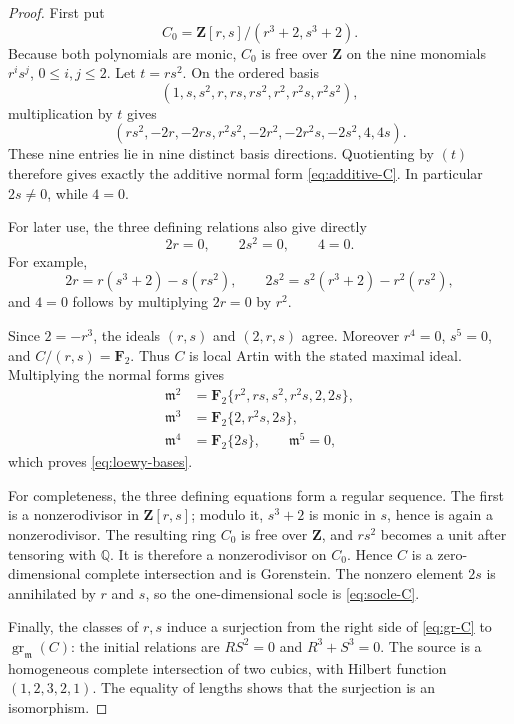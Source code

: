 \documentclass[11pt]{amsart}
\theoremstyle{definition}
\theoremstyle{remark}
\newcommand{\Z}{\mathbf Z}
\newcommand{\F}{\mathbf F}
\newcommand{\gr}{\operatorname{gr}}
\newcommand{\m}{\mathfrak m}
\begin{document}
\begin{proof}
First put
\[
 C_0=\Z[r,s]/(r^3+2,s^3+2).
\]
Because both polynomials are monic, \(C_0\) is free over \(\Z\) on the
nine monomials \(r^is^j\), \(0\le i,j\le2\).  Let \(t=rs^2\).  On the
ordered basis
\[
 (1,s,s^2,r,rs,rs^2,r^2,r^2s,r^2s^2),
\]
multiplication by \(t\) gives
\[
 (rs^2,-2r,-2rs,r^2s^2,-2r^2,-2r^2s,-2s^2,4,4s).
\]
These nine entries lie in nine distinct basis directions.  Quotienting by
\((t)\) therefore gives exactly the additive normal form
\eqref{eq:additive-C}.  In particular \(2s\ne0\), while \(4=0\).

For later use, the three defining relations also give directly
\begin{equation}\label{eq:base-consequences}
 2r=0,
 \qquad
 2s^2=0,
 \qquad
 4=0.
\end{equation}
For example,
\[
 2r=r(s^3+2)-s(rs^2),
 \qquad
 2s^2=s^2(r^3+2)-r^2(rs^2),
\]
and \(4=0\) follows by multiplying \(2r=0\) by \(r^2\).

Since \(2=-r^3\), the ideals \((r,s)\) and \((2,r,s)\) agree.  Moreover
\(r^4=0\), \(s^5=0\), and \(C/(r,s)=\F_2\).  Thus \(C\) is local Artin with
the stated maximal ideal.  Multiplying the normal forms gives
\begin{align*}
 \m^2&=\F_2\{r^2,rs,s^2,r^2s,2,2s\},\\
 \m^3&=\F_2\{2,r^2s,2s\},\\
 \m^4&=\F_2\{2s\},
 \qquad \m^5=0,
\end{align*}
which proves \eqref{eq:loewy-bases}.

For completeness, the three defining equations form a regular sequence.
The first is a nonzerodivisor in \(\Z[r,s]\); modulo it, \(s^3+2\) is monic
in \(s\), hence is again a nonzerodivisor.  The resulting ring \(C_0\) is
free over \(\Z\), and \(rs^2\) becomes a unit after tensoring with
\(\mathbb Q\).  It is therefore a nonzerodivisor on \(C_0\).  Hence \(C\)
is a zero-dimensional complete intersection and is Gorenstein.  The
nonzero element \(2s\) is annihilated by \(r\) and \(s\), so the
one-dimensional socle is \eqref{eq:socle-C}.

Finally, the classes of \(r,s\) induce a surjection from the right side of
\eqref{eq:gr-C} to \(\gr_{\m}(C)\): the initial relations are \(RS^2=0\)
and \(R^3+S^3=0\).  The source is a homogeneous complete intersection of
two cubics, with Hilbert function \((1,2,3,2,1)\).  The equality of lengths
shows that the surjection is an isomorphism.
\end{proof}
\end{document}

